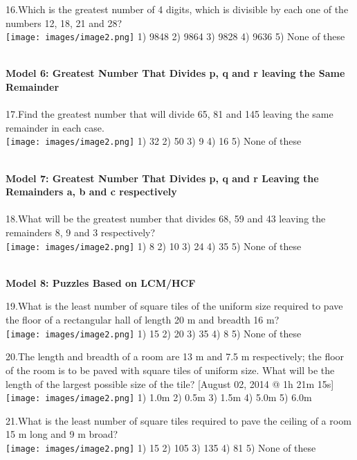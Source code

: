 \documentclass[
]{article}
\begin{document}
16.Which is the greatest number of 4 digits, which is divisible by each one of the numbers 12, 18, 21 and 28?\\
\texttt{[image: images/image2.png]} 1) 9848 	2) 9864 	3) 9828 	4) 9636 	5) None of these

\textbf{\\ Model 6: Greatest Number That Divides p, q and r leaving the Same Remainder \\}
\\ 17.Find the greatest number that will divide 65, 81 and 145 leaving the same remainder in each case. \\
\texttt{[image: images/image2.png]} 1) 32 	2) 50 	3) 9 	4) 16 	5) None of these

\textbf{\\ Model 7: Greatest Number That Divides p, q and r Leaving the Remainders a, b and c respectively \\}
\\ 18.What will be the greatest number that divides 68, 59 and 43 leaving the remainders 8, 9 and 3 respectively? \\
\texttt{[image: images/image2.png]} 1) 8 2) 10 3) 24 4) 35 5) None of these


\textbf{\\ Model 8: Puzzles Based on LCM/HCF \\}

19.What is the least number of square tiles of the uniform size required to pave the floor of a rectangular hall of length 20 m and breadth 16 m?\\
\texttt{[image: images/image2.png]}  1) 15 	2) 20 	3) 35 	4) 8 	5) None of these

20.The length and breadth of a room are 13 m and 7.5 m respectively; the floor of the room is to be paved with square tiles of uniform size. What will be the length of the largest possible size of the tile? [August 02, 2014 @ 1h 21m 15s] \\
\texttt{[image: images/image2.png]} 1) 1.0m 	2) 0.5m 	3) 1.5m 	4) 5.0m 	5) 6.0m

21.What is the least number of square tiles required to pave the ceiling of a room 15 m long and 9 m broad? \\
\texttt{[image: images/image2.png]} 1) 15 	2) 105 	3) 135 	4) 81 	5) None of these
\end{document}

